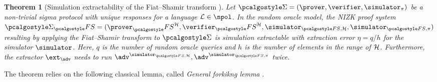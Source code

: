 \documentclass[runningheads]{llncs}
\newtheorem{theorem}{Theorem}%
\theoremstyle{definition}
\begin{document}
\begin{theorem}[Simulation extractability of the Fiat--Shamir transform \cite{INDOCRYPT:FKMV12}]
	Let $\sigmaprot = (\prover, \verifier, \simulator_\zkproof)$ be a non-trivial sigma protocol with unique responses for a language $\LANG \in \npol$. 
	In the random oracle model, the NIZK proof system $\sigmaprot_\fs = (\prover_\fs^\ro, \verifier_\fs^\ro, \simulator_{\fs, \ro}, \simulator_{\fs, \zkproof})$ resulting by applying the Fiat--Shamir transform to $\sigmaprot$ is simulation extractable with extraction error $\eta = q/h$ for the simulator $\simulator$. Here, $q$ is the number of random oracle queries and $h$ is the number of elements in the range of $\mathcal{H}$. 
	Furthermore, the extractor $\ext_\adv$ needs to run $\adv^{\simulator_{\fs, \ro}}, \adv^{\simulator_{\fs, \zkproof}}$ twice.
\end{theorem}

The theorem relies on the following classical lemma, called \emph{General forkikng lemma} \cite{JC:PoiSte00}.
%
\end{document}
